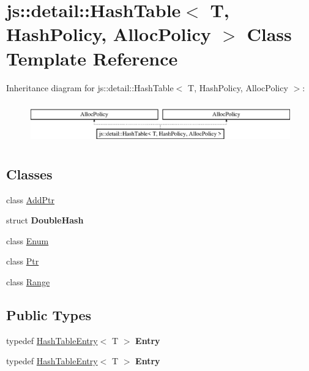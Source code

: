 \hypertarget{classjs_1_1detail_1_1_hash_table}{\section{js\-:\-:detail\-:\-:Hash\-Table$<$ T, Hash\-Policy, Alloc\-Policy $>$ Class Template Reference}
\label{classjs_1_1detail_1_1_hash_table}
}
Inheritance diagram for js\-:\-:detail\-:\-:Hash\-Table$<$ T, Hash\-Policy, Alloc\-Policy $>$\-:\begin{figure}[H]
\begin{center}
\leavevmode
\includegraphics[height=1.818182cm]{classjs_1_1detail_1_1_hash_table}
\end{center}
\end{figure}
\subsection*{Classes}
\begin{DoxyCompactItemize}
\item 
class \hyperlink{classjs_1_1detail_1_1_hash_table_1_1_add_ptr}{Add\-Ptr}
\item 
struct {\bfseries Double\-Hash}
\item 
class \hyperlink{classjs_1_1detail_1_1_hash_table_1_1_enum}{Enum}
\item 
class \hyperlink{classjs_1_1detail_1_1_hash_table_1_1_ptr}{Ptr}
\item 
class \hyperlink{classjs_1_1detail_1_1_hash_table_1_1_range}{Range}
\end{DoxyCompactItemize}
\subsection*{Public Types}
\begin{DoxyCompactItemize}
\item 
\hypertarget{classjs_1_1detail_1_1_hash_table_a1d4ac4719b78f7b909a3b47ad9d80256}{typedef \hyperlink{classjs_1_1detail_1_1_hash_table_entry}{Hash\-Table\-Entry}$<$ T $>$ {\bfseries Entry}}\label{classjs_1_1detail_1_1_hash_table_a1d4ac4719b78f7b909a3b47ad9d80256}

\item 
\hypertarget{classjs_1_1detail_1_1_hash_table_a1d4ac4719b78f7b909a3b47ad9d80256}{typedef \hyperlink{classjs_1_1detail_1_1_hash_table_entry}{Hash\-Table\-Entry}$<$ T $>$ {\bfseries Entry}}\label{classjs_1_1detail_1_1_hash_table_a1d4ac4719b78f7b909a3b47ad9d80256}

\end{DoxyCompactItemize}
